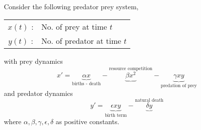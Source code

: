 \documentclass{article}
\begin{document}
\begin{eg}
    Consider the following predator prey system,
    \begin{center}
        \begin{tabular}{cl}
            $x(t)$ :& No. of prey at time $t$ \\
            $y(t)$ :& No. of predator at time $t$
        \end{tabular}
    \end{center}
    with prey dynamics
    \[
        x' = \underbrace{\alpha x}_{\text{births - death}} - \underbrace{\beta x^2}^{\text{resource competition}} - \underbrace{\gamma xy}_{\text{predation of prey}}  
    \]
    and predator dynamics
    \[
        y' = \underbrace{\epsilon xy}_{\text{birth term}} - \underbrace{\delta y}^{\text{natural death}}    
    \]
    where $\alpha, \beta, \gamma, \epsilon, \delta$ as positive constants.


\end{eg}
\end{document}
